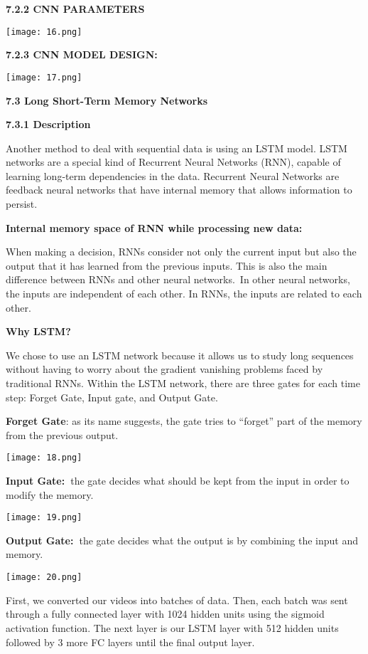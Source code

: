 \documentclass[a4paper,12pt]{article}
\begin{document}
\textbf{7.2.2 CNN PARAMETERS}

\texttt{[image: 16.png]}

\textbf{7.2.3 CNN MODEL DESIGN:}

\texttt{[image: 17.png]}

\textbf{7.3 Long Short-Term Memory Networks}

\textbf{7.3.1 Description}

Another method to deal with sequential data is using an LSTM model. LSTM
networks are a special kind of Recurrent Neural Networks (RNN), capable
of learning long-term dependencies in the data. Recurrent Neural
Networks are feedback neural networks that have internal memory that
allows information to persist.

\textbf{Internal memory space of RNN while processing new data:}

When making a decision, RNNs consider not only the current input but
also the output that it has learned from the previous inputs. This is
also the main difference between RNNs and other neural networks.~In
other neural networks, the inputs are independent of each other. In
RNNs, the inputs are related to each other.

\textbf{Why LSTM?}

We chose to use an LSTM network because it allows us to study long
sequences without having to worry about the gradient vanishing problems
faced by traditional RNNs. Within the LSTM network, there are three
gates for each time step: Forget Gate, Input gate, and Output Gate.

\textbf{Forget Gate}: as its name suggests, the gate tries to ``forget''
part of the memory from the previous output.

\texttt{[image: 18.png]}

\textbf{Input Gate:~}the gate decides what should be kept from the input
in order to modify the memory.

\texttt{[image: 19.png]}

\textbf{Output Gate:~}the gate decides what the output is by combining
the input and memory.

\texttt{[image: 20.png]}

First, we converted our videos into batches of data. Then, each batch
was sent through a fully connected layer with 1024 hidden units using
the sigmoid activation function. The next layer is our LSTM layer with
512 hidden units followed by 3 more FC layers until the final output
layer.
\end{document}
